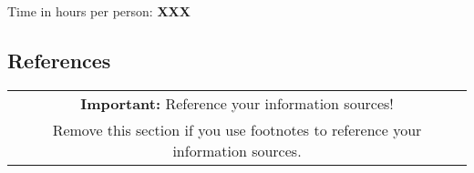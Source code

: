 \documentclass[11pt]{scrartcl}
\begin{document}
Time in hours per person: \textbf{XXX}

\subsection*{References}

\begin{table}[H]
  \centering
  \begin{tabular}{c}
    \hline
    \textbf{Important:} Reference your information sources! \tabularnewline
    Remove this section if you use footnotes to reference your information sources. \tabularnewline
    \hline
  \end{tabular}
\end{table}
\end{document}
